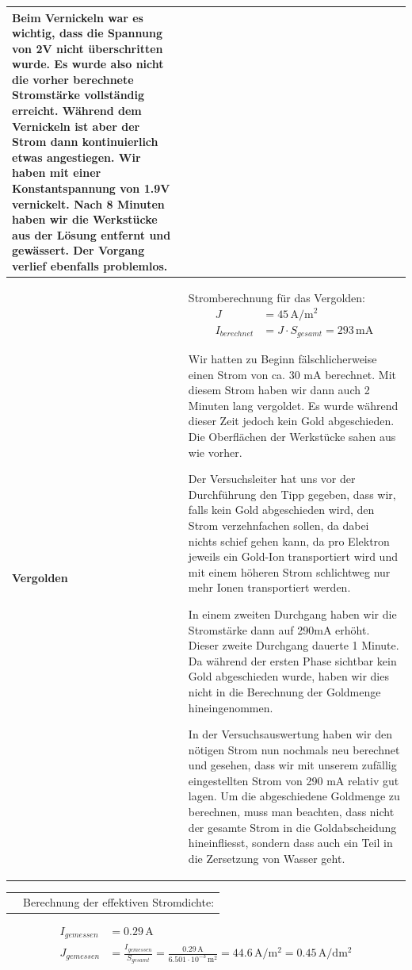 \begin{longtable}{p{3cm}p{14cm}}
    Beim Vernickeln war es wichtig, dass die Spannung von 2V nicht überschritten wurde. Es wurde also nicht die vorher berechnete Stromstärke vollständig erreicht. Während dem Vernickeln ist aber der Strom dann kontinuierlich etwas angestiegen. Wir haben mit einer Konstantspannung von 1.9V vernickelt. Nach 8 Minuten haben wir die Werkstücke aus der Lösung entfernt und gewässert. Der Vorgang verlief ebenfalls problemlos.\\
    \hline
    
    \textbf{Vergolden}
    & Stromberechnung für das Vergolden:
    $$\begin{aligned}
        J &= 45 \, \mathrm{A/m^2}\\
        I_{berechnet} &= J \cdot S_{gesamt} = 293 \, \mathrm{mA}
    \end{aligned}$$
    
    Wir hatten zu Beginn fälschlicherweise einen Strom von ca. 30 mA berechnet. Mit diesem Strom haben wir dann auch 2 Minuten lang vergoldet. Es wurde während dieser Zeit jedoch kein Gold abgeschieden. Die Oberflächen der Werkstücke sahen aus wie vorher.
    
    Der Versuchsleiter hat uns vor der Durchführung den Tipp gegeben, dass wir, falls kein Gold abgeschieden wird, den Strom verzehnfachen sollen, da dabei nichts schief gehen kann, da pro Elektron jeweils ein Gold-Ion transportiert wird und mit einem höheren Strom schlichtweg nur mehr Ionen transportiert werden.
    
    In einem zweiten Durchgang haben wir die Stromstärke dann auf 290mA erhöht. Dieser zweite Durchgang dauerte 1 Minute. Da während der ersten Phase sichtbar kein Gold abgeschieden wurde, haben wir dies nicht in die Berechnung der Goldmenge hineingenommen.
    
    In der Versuchsauswertung haben wir den nötigen Strom nun nochmals neu berechnet und gesehen, dass wir mit unserem zufällig eingestellten Strom von 290 mA relativ gut lagen.\newline
    Um die abgeschiedene Goldmenge zu berechnen, muss man beachten, dass nicht der gesamte Strom in die Goldabscheidung hineinfliesst, sondern dass auch ein Teil in die Zersetzung von Wasser geht.
\end{longtable}

\begin{longtable}{p{3cm}p{14cm}}
    & Berechnung der effektiven Stromdichte:
\end{longtable}

    $$\begin{aligned}
        I_{gemessen} &= 0.29 \, \mathrm{A}\\
        J_{gemessen} &= \frac{I_{gemessen}}{S_{gesamt}} = \frac{0.29 \, \mathrm{A}}{6.501 \cdot 10^{-3} \, \mathrm{m^2}} = 44.6 \, \mathrm{A/m^2} = 0.45 \, \mathrm{A/dm^2}
    \end{aligned}$$
    
